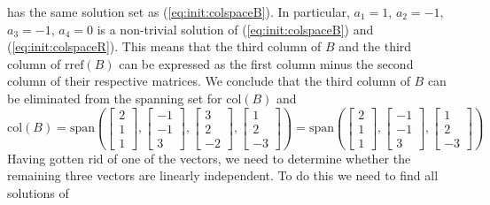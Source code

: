 \documentclass{ximera}
\begin{document}
\begin{exploration}
has the same solution set as (\ref{eq:init:colspaceB}).  In particular, $a_1=1$, $a_2=-1$, $a_3=-1$, $a_4=0$ is a non-trivial solution of (\ref{eq:init:colspaceB}) and (\ref{eq:init:colspaceR}).  This means that the third column of $B$ and the third column of $\mbox{rref}(B)$ can be expressed as the first column minus the second column of their respective matrices.  We conclude that the third column of $B$ can be eliminated from the spanning set for $\mbox{col}(B)$ and 
$$\mbox{col}(B)=\mbox{span}\left(\begin{bmatrix}2\\1\\1\end{bmatrix},\begin{bmatrix}-1\\-1\\3\end{bmatrix}, \begin{bmatrix}3\\2\\-2\end{bmatrix}, \begin{bmatrix}1\\2\\-3\end{bmatrix}\right)=\mbox{span}\left(\begin{bmatrix}2\\1\\1\end{bmatrix},\begin{bmatrix}-1\\-1\\3\end{bmatrix}, \begin{bmatrix}1\\2\\-3\end{bmatrix}\right)$$
Having gotten rid of one of the vectors, we need to determine whether the remaining three vectors are linearly independent.  To do this we need to find all solutions of 


\end{exploration}
\end{document}
